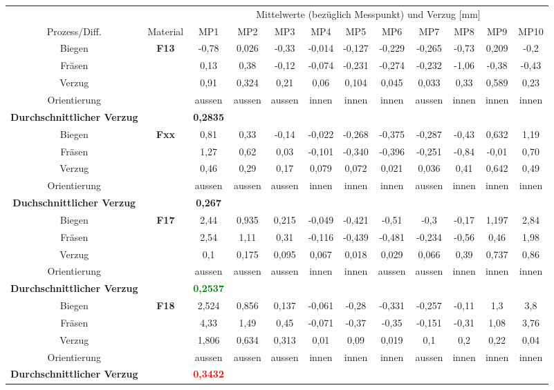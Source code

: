 \documentclass[12pt,a4paper,parskip,twoside,BCOR5mm,headsepline]{scrartcl}
\begin{document}
\begin{table}
\begin{tabular}{cccccccccccc}
\toprule
&& \multicolumn{10}{c}{Mittelwerte (bezüglich Messpunkt) und Verzug [\si{\milli\meter}]} \\
\cmidrule(2){3-12}
Prozess/Diff. & Material & MP1 & MP2 & MP3 & MP4 & MP5 & MP6 & MP7 & MP8 & MP9 & MP10 \\
\midrule
Biegen & \textbf{F13} & -0,78 & 0,026 & -0,33 & -0,014 & -0,127 & -0,229 & -0,265 & -0,73 & 0,209 & -0,2 \\
Fräsen && 0,13 & 0,38 & -0,12 & -0,074 & -0,231 & -0,274 & -0,232 & -1,06 & -0,38 & -0,43 \\
Verzug && 0,91 & 0,324 & 0,21 & 0,06 & 0,104 & 0,045 & 0,033 & 0,33 & 0,589 & 0,23 \\
Orientierung && aussen & aussen & aussen & innen & innen & innen & aussen & innen & innen & innen \\
\textbf{Durchschnittlicher Verzug} &&\textbf{0,2835}&&&&&&&&&\\
\midrule
Biegen & \textbf{Fxx} & 0,81 & 0,33 & -0,14 & -0,022 & -0,268 & -0,375 & -0,287 & -0,43 & 0,632 & 1,19\\
Fräsen && 1,27 & 0,62 & 0,03 & -0,101 & -0,340 & -0,396 & -0,251 & -0,84 & -0,01 & 0,70 \\
Verzug && 0,46 & 0,29 & 0,17 & 0,079 & 0,072 & 0,021 & 0,036 & 0,41 & 0,642 & 0,49 \\
Orientierung && aussen & aussen & aussen & innen & innen & innen & aussen & innen & innen & innen \\
\textbf{Duchschnittlicher Verzug} && \textbf{0,267}&&&&&&&&&\\
\midrule
Biegen & \textbf{F17} & 2,44 & 0,935 & 0,215 & -0,049 & -0,421 & -0,51 & -0,3 & -0,17 & 1,197 & 2,84 \\
Fräsen && 2,54 & 1,11 & 0,31 & -0,116 & -0,439  & -0,481  & -0,234  & -0,56 & 0,46 & 1,98  \\
Verzug && 0,1 & 0,175 & 0,095 & 0,067 & 0,018 & 0,029 &  0,066 & 0,39 & 0,737 & 0,86 \\
Orientierung && aussen & aussen & aussen & innen & innen & aussen & aussen & innen & innen & innen \\
\textbf{Durchschnittlicher Verzug} && \textbf{\textcolor{green}{0,2537}} &&&&&&&&&\\
\midrule
Biegen & \textbf{F18} & 2,524 & 0,856 & 0,137 & -0,061 & -0,28 & -0,331 & -0,257 & -0,11 & 1,3 & 3,8 \\
Fräsen && 4,33 & 1,49 & 0,45 & -0,071 & -0,37 & -0,35 & -0,151 & -0,31 & 1,08 & 3,76 \\
Verzug && 1,806 & 0,634 & 0,313 & 0,01 & 0,09 & 0,019 & 0,1 & 0,2 & 0,22 & 0,04 \\
Orientierung && aussen & aussen & aussen & innen & innen & innen & aussen & innen & innen & innen \\
\textbf{Durchschnittlicher Verzug} && \textbf{\textcolor{red}{0,3432}} &&&&&&&&&\\
\bottomrule
\end{tabular}
\end{table}
\end{document}
